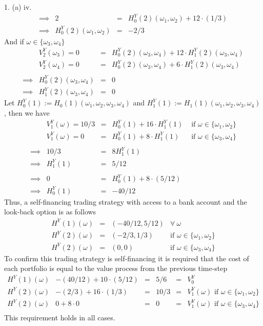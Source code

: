 \documentclass[11pt,a4paper]{article}
\begin{document}
\begin{answer}{1. (a) iv.}
\[\begin{array}{rrcl}
    \implies&2&=&H_0^Y(2)(\omega_1,\omega_2)+12\cdot(1/3)\\
    \implies&H_0^Y(2)(\omega_1,\omega_2)&=&-2/3
  \end{array}\]
  And if $\omega\in\{\omega_3,\omega_4\}$
  \[\begin{array}{rrcl}
    &V_2^Y(\omega_3)=0&=&H_0^Y(2)(\omega_3,\omega_4)+12\cdot H_1^Y(2)(\omega_3,\omega_4)\\
    &V_2^Y(\omega_4)=0&=&H_0^Y(2)(\omega_3,\omega_4)+6\cdot H_1^Y(2)(\omega_3,\omega_4)\\\\
    \implies&H_0^Y(2)(\omega_3,\omega_4)&=&0\\
    \implies&H_1^Y(2)(\omega_3,\omega_4)&=&0
  \end{array}\]
  Let $H_0^Y(1):=H_0(1)(\omega_1,\omega_2,\omega_3,\omega_4)$ and $H_1^Y(1):=H_1(1)(\omega_1,\omega_2,\omega_3,\omega_4)$, then we have
  \[\begin{array}{rrcll}
    &V_1^Y(\omega)=10/3&=&H_0^Y(1)+16\cdot H_1^Y(1)&\text{ if }\omega\in\{\omega_1,\omega_2\}\\
    &V_1^Y(\omega)=0&=&H_0^Y(1)+8\cdot H_1^Y(1)&\text{ if }\omega\in\{\omega_3,\omega_4\}\\\\
    \implies&10/3&=&8H_1^Y(1)\\
    \implies&H_1^Y(1)&=&5/12\\\\
    \implies&0&=&H_0^Y(1)+8\cdot(5/12)\\
    \implies&H_0^Y(1)&=&-40/12
  \end{array}\]
  Thus, a self-financing trading strategy with access to a bank account and the look-back option is as follows
  \[\begin{array}{rcll}
    H^Y(1)(\omega)&=&(-40/12,5/12)&\forall\ \omega\\
    H^Y(2)(\omega)&=&(-2/3,1/3)&\text{if }\omega\in\{\omega_1,\omega_2\}\\
    H^Y(2)(\omega)&=&(0,0)&\text{if }\omega\in\{\omega_3,\omega_4\}
  \end{array}\]
  To confirm this trading strategy is self-financing it is required that the cost of each portfolio is equal to the value process from the previous time-step
  \[\begin{array}{r|rclcl}
    H^Y(1)(\omega)&-(40/12)+10\cdot(5/12)&=&5/6&=&V_0^Y\\
    H^Y(2)(\omega)&-(2/3)+16\cdot(1/3)&=&10/3&=&V_1^Y(\omega)\text{ if }\omega\in\{\omega_1,\omega_2\}\\
    H^Y(2)(\omega)&0+8\cdot0&=&0&=&V_1^Y(\omega)\text{ if }\omega\in\{\omega_3,\omega_4\}\\
  \end{array}\]
  This requirement holds in all cases.
\end{answer}
\end{document}
